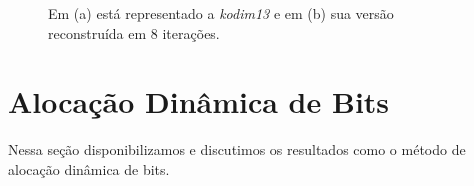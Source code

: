\begin{figure}	
	\newline
	\caption[Imagem representativa com baixo fator de compressão]{Em (a) está representado a \textit{kodim13} e em (b) sua versão reconstruída em 8 iterações.}
	\label{fig:kodim13}
\end{figure}


\section{Alocação Dinâmica de Bits}

Nessa seção disponibilizamos e discutimos os resultados como o método de alocação dinâmica de bits. 

